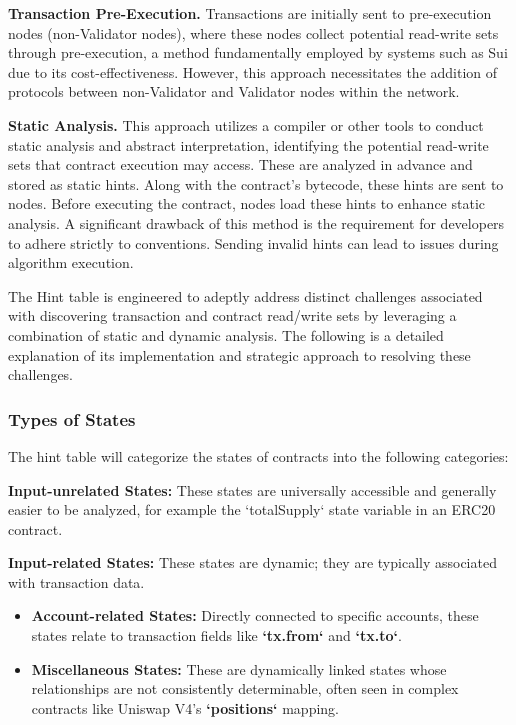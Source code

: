 \textbf{Transaction Pre-Execution.} Transactions are initially sent to pre-execution nodes (non-Validator nodes), where these nodes collect potential read-write sets through pre-execution, a method fundamentally employed by systems such as Sui due to its cost-effectiveness. However, this approach necessitates the addition of protocols between non-Validator and Validator nodes within the network.

\textbf{Static Analysis.} This approach utilizes a compiler or other tools to conduct static analysis and abstract interpretation, identifying the potential read-write sets that contract execution may access. These are analyzed in advance and stored as static hints. Along with the contract's bytecode, these hints are sent to nodes. Before executing the contract, nodes load these hints to enhance static analysis. A significant drawback of this method is the requirement for developers to adhere strictly to conventions. Sending invalid hints can lead to issues during algorithm execution.

The Hint table is engineered to adeptly address distinct challenges associated with discovering transaction and contract read/write sets by leveraging a combination of static and dynamic analysis. The following is a detailed explanation of its implementation and strategic approach to resolving these challenges.

\subsubsection{Types of States}

The hint table will categorize the states of contracts into the following categories:

\textbf{Input-unrelated States:} These states are universally accessible and generally easier to be analyzed, for example the `totalSupply` state variable in an ERC20 contract.

\textbf{Input-related States:} These states are dynamic; they are typically associated with transaction data.
\begin{itemize}
\item \textbf{Account-related States:} Directly connected to specific accounts, these states relate to transaction fields like \textbf{`tx.from`} and \textbf{`tx.to`}.
\item \textbf{Miscellaneous States:} These are dynamically linked states whose relationships are not consistently determinable, often seen in complex contracts like Uniswap V4's \textbf{`positions`} mapping.
\end{itemize}
